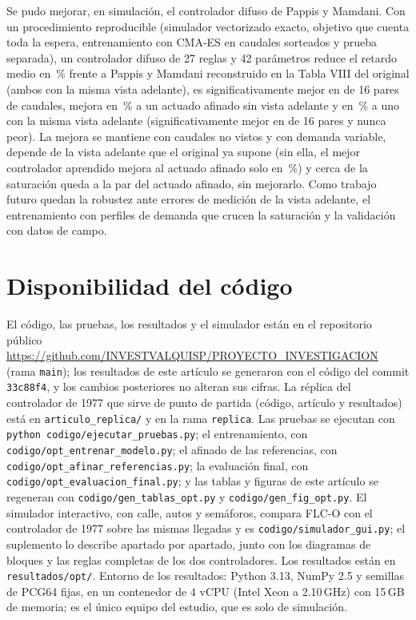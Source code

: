 \documentclass[journal]{IEEEtran}
\newcommand{\FLC}{FLC-O}
\newcommand{\PMR}{Pappis y Mamdani reconstruido}
\begin{document}
Se pudo mejorar, en simulación, el controlador difuso de Pappis y Mamdani. Con un procedimiento reproducible (simulador vectorizado exacto, objetivo que cuenta toda la espera, entrenamiento con CMA-ES en caudales sorteados y prueba separada), un controlador difuso de 27 reglas y 42 parámetros reduce el retardo medio en \RedFlc\,\% frente a \PMR{} en la Tabla VIII del original (ambos con la misma vista adelante), es significativamente mejor en \ParMejorPap{} de 16 pares de caudales, mejora en \RedActAfOf\,\% a un actuado afinado sin vista adelante y en \RedActVOf\,\% a uno con la misma vista adelante (significativamente mejor en \ParMejorActV{} de 16 pares y nunca peor). La mejora se mantiene con caudales no vistos y con demanda variable, depende de la vista adelante que el original ya supone (sin ella, el mejor controlador aprendido mejora al actuado afinado solo en \RedActMlpC\,\%) y cerca de la saturación queda a la par del actuado afinado, sin mejorarlo. Como trabajo futuro quedan la robustez ante errores de medición de la vista adelante, el entrenamiento con perfiles de demanda que crucen la saturación y la validación con datos de campo.

\section*{Disponibilidad del código}
\label{sec:disp}
\raggedright El código, las pruebas, los resultados y el simulador están en el repositorio público \url{https://github.com/INVESTVALQUISP/PROYECTO_INVESTIGACION} (rama \texttt{main}); los resultados de este artículo se generaron con el código del commit \texttt{33c88f4}, y los cambios posteriores no alteran sus cifras. La réplica del controlador de 1977 que sirve de punto de partida (código, artículo y resultados) está en \texttt{articulo\_replica/} y en la rama \texttt{replica}. Las pruebas se ejecutan con \texttt{python codigo/ejecutar\_pruebas.py}; el entrenamiento, con \texttt{codigo/opt\_entrenar\_modelo.py}; el afinado de las referencias, con \texttt{codigo/opt\_afinar\_referencias.py}; la evaluación final, con \texttt{codigo/opt\_evaluacion\_final.py}; y las tablas y figuras de este artículo se regeneran con \texttt{codigo/gen\_tablas\_opt.py} y \texttt{codigo/gen\_fig\_opt.py}. El simulador interactivo, con calle, autos y semáforos, compara \FLC{} con el controlador de 1977 sobre las mismas llegadas y es \texttt{codigo/simulador\_gui.py}; el suplemento lo describe apartado por apartado, junto con los diagramas de bloques y las reglas completas de los dos controladores. Los resultados están en \texttt{resultados/opt/}. Entorno de los resultados: Python 3.13, NumPy 2.5 y semillas de PCG64 fijas, en un contenedor de 4 vCPU (Intel Xeon a 2.10\,GHz) con 15\,GB de memoria; es el único equipo del estudio, que es solo de simulación.



\end{document}
